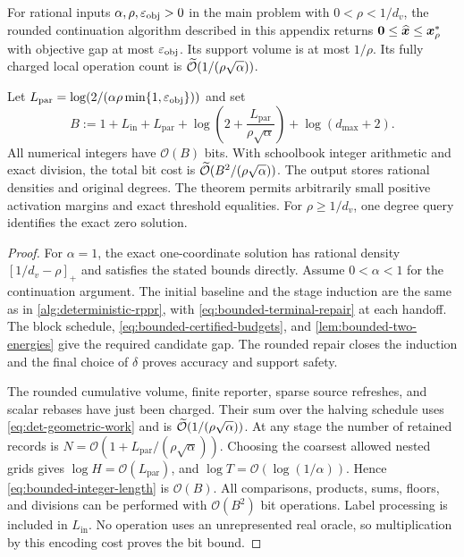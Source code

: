 \begin{theorem}
\label{thm:bounded-deterministic-rppr}
For rational inputs $\alpha,\rho,\varepsilon_{\mathrm{obj}}>0$ in the main problem with
$0<\rho<1/d_v$, the rounded continuation algorithm described in this
appendix returns
$\bm{0}\leq\widehat{\bm{x}}\leq\bm{x}_\rho^*$ with objective gap at most
$\varepsilon_{\mathrm{obj}}$. Its support volume is at most $1/\rho$. Its fully charged
local operation count is $\widetilde{\mathcal{O}}(1/(\rho\sqrt\alpha))$.

Let $L_{\mathrm{par}}=\log(2/(\alpha\rho\min\{1,\varepsilon_{\mathrm{obj}}\}))$ and set
\begin{equation*}
 B:=1+L_{\mathrm{in}}+L_{\mathrm{par}}
       +\log\!\left(2+\frac{L_{\mathrm{par}}}{\rho\sqrt\alpha}\right)
       +\log(d_{\max}+2).
\end{equation*}
All numerical integers have $\mathcal{O}(B)$ bits. With schoolbook integer arithmetic
and exact division, the total bit cost is
$\widetilde{\mathcal{O}}(B^2/(\rho\sqrt\alpha))$. The output stores rational densities
and original degrees. The theorem permits arbitrarily small positive
activation margins and exact threshold equalities. For $\rho\geq1/d_v$,
one degree query identifies the exact zero solution.
\end{theorem}
\begin{proof}
For $\alpha=1$, the exact one-coordinate solution has rational density
$[1/d_v-\rho]_+$ and satisfies the stated bounds directly. Assume
$0<\alpha<1$ for the continuation argument.
The initial baseline and the stage induction are the same as in
\cref{alg:deterministic-rppr}, with \cref{eq:bounded-terminal-repair} at
each handoff. The block schedule, \cref{eq:bounded-certified-budgets}, and
\cref{lem:bounded-two-energies} give the required candidate gap.
The rounded repair closes the induction and the final choice of $\delta$
proves accuracy and support safety.

The rounded cumulative volume, finite reporter, sparse source refreshes,
and scalar rebases have just been charged. Their sum over the halving
schedule uses \cref{eq:det-geometric-work} and is
$\widetilde{\mathcal{O}}(1/(\rho\sqrt\alpha))$. At any stage the number of retained
records is $N=\mathcal{O}(1+L_{\mathrm{par}}/(\rho\sqrt\alpha))$.
Choosing the coarsest allowed nested grids gives
$\log H=\mathcal{O}(L_{\mathrm{par}})$, and $\log T=\mathcal{O}(\log(1/\alpha))$.
Hence \cref{eq:bounded-integer-length} is $\mathcal{O}(B)$.
All comparisons, products, sums, floors, and divisions can be performed
with $\mathcal{O}(B^2)$ bit operations. Label processing is included in $L_{\mathrm{in}}$.
No operation uses an unrepresented real oracle, so multiplication by this
encoding cost proves the bit bound.
\end{proof}
